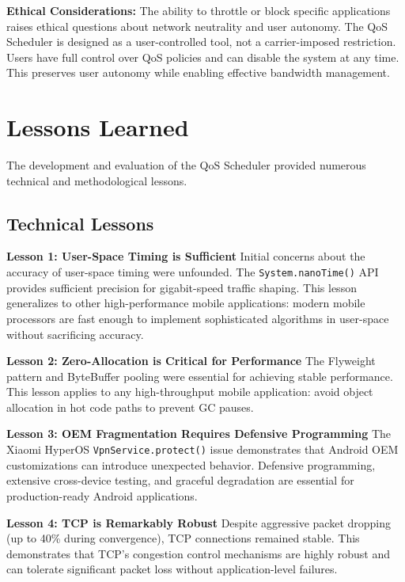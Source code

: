 \textbf{Ethical Considerations:}
The ability to throttle or block specific applications raises ethical questions about network neutrality and user autonomy. The QoS Scheduler is designed as a user-controlled tool, not a carrier-imposed restriction. Users have full control over QoS policies and can disable the system at any time. This preserves user autonomy while enabling effective bandwidth management.

\section{Lessons Learned}
\label{sec:lessons_learned_conclusion}

The development and evaluation of the QoS Scheduler provided numerous technical and methodological lessons.

\subsection{Technical Lessons}

\textbf{Lesson 1: User-Space Timing is Sufficient}
Initial concerns about the accuracy of user-space timing were unfounded. The \texttt{System.nanoTime()} API provides sufficient precision for gigabit-speed traffic shaping. This lesson generalizes to other high-performance mobile applications: modern mobile processors are fast enough to implement sophisticated algorithms in user-space without sacrificing accuracy.

\textbf{Lesson 2: Zero-Allocation is Critical for Performance}
The Flyweight pattern and ByteBuffer pooling were essential for achieving stable performance. This lesson applies to any high-throughput mobile application: avoid object allocation in hot code paths to prevent GC pauses.

\textbf{Lesson 3: OEM Fragmentation Requires Defensive Programming}
The Xiaomi HyperOS \texttt{VpnService.protect()} issue demonstrates that Android OEM customizations can introduce unexpected behavior. Defensive programming, extensive cross-device testing, and graceful degradation are essential for production-ready Android applications.

\textbf{Lesson 4: TCP is Remarkably Robust}
Despite aggressive packet dropping (up to 40\% during convergence), TCP connections remained stable. This demonstrates that TCP's congestion control mechanisms are highly robust and can tolerate significant packet loss without application-level failures.

